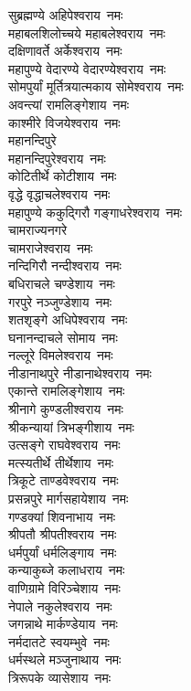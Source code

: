 \begin{multicols}{2}
\begin{flushleft}
सुब्रह्मण्ये अहिपेश्वराय~नमः\\
महाबलशिलोच्चये महाबलेश्वराय~नमः\\
दक्षिणावर्ते अर्केश्वराय~नमः\\
महापुण्ये वेदारण्ये वेदारण्येश्वराय~नमः\\
सोमपुर्यां मूर्तित्रयात्मकाय  सोमेश्वराय~नमः\\
अवन्त्यां रामलिङ्गेशाय~नमः\hfill{}\\
काश्मीरे विजयेश्वराय~नमः\\
महानन्दिपुरे\\ महानन्दिपुरेश्वराय~नमः\\
कोटितीर्थे कोटीशाय~नमः\\
वृद्धे वृद्धाचलेश्वराय~नमः\\
महापुण्ये ककुद्गिरौ गङ्गाधरेश्वराय~नमः\\
चामराज्यनगरे\\ चामराजेश्वराय~नमः\\
नन्दिगिरौ नन्दीश्वराय~नमः\\
बधिराचले चण्डेशाय~नमः\\
गरपुरे नञ्जुण्डेशाय~नमः\\
शतशृङ्गे अधिपेश्वराय~नमः\hfill{}\\
घनानन्दाचले सोमाय~नमः\\
नल्लूरे विमलेश्वराय~नमः\\
नीडानाथपुरे नीडानाथेश्वराय~नमः\\
एकान्ते रामलिङ्गेशाय~नमः\\
श्रीनागे कुण्डलीश्वराय~नमः\\
श्रीकन्यायां त्रिभङ्गीशाय~नमः\\
उत्सङ्गे राघवेश्वराय~नमः\\
मत्स्यतीर्थे तीर्थेशाय~नमः\\
त्रिकूटे ताण्डवेश्वराय~नमः\\
प्रसन्नपुरे मार्गसहायेशाय~नमः\hfill{}\\
गण्डक्यां शिवनाभाय~नमः\\
श्रीपतौ श्रीपतीश्वराय~नमः\\
धर्मपुर्यां धर्मलिङ्गाय~नमः\\
कन्याकुब्जे कलाधराय~नमः\\
वाणिग्रामे विरिञ्चेशाय~नमः\\
नेपाले नकुलेश्वराय~नमः\\
जगन्नाथे मार्कण्डेयाय~नमः\\
नर्मदातटे स्वयम्भुवे~नमः\\
धर्मस्थले मञ्जुनाथाय~नमः\\
त्रिरूपके व्यासेशाय~नमः\hfill{}\\

\end{flushleft}
\end{multicols}

